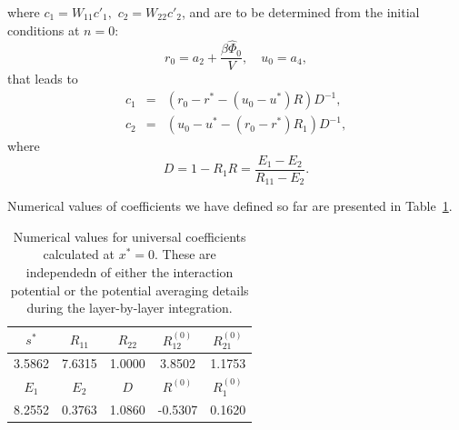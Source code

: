 where $c_1 = W_{11} c'_1,$ $c_2 = W_{22} c'_2$, and are to be determined from the initial conditions at $n=0$:
\begin{equation*}
	r_0 = a_2 + \frac{\beta\hat{\Phi}_0}{V},
	\quad
	u_0 = a_4,
\end{equation*}
that leads to
\begin{eqnarray*}
	c_1 & = & (r_0 - r^* -(u_0 - u^*)R)D^{-1},
	\\
	c_2 & = &  (u_0 - u^* - (r_0 - r^*)R_1)D^{-1},
\end{eqnarray*}
where
\begin{equation*}
	D = 1 - R_1 R = \frac{E_1 - E_2}{R_{11} - E_2}.
\end{equation*}

Numerical values of coefficients we have defined so far are presented in Table~\ref{tab:num_coef}.

\begin{table}[h]
	\caption{Numerical values for universal coefficients calculated at $x^* = 0$. These are independedn of either the interaction potential or the potential averaging details during the layer-by-layer integration.}
	\begin{center}
		\begin{tabular}{|c|c|c|c|c|}
			\hline
			$s^*$ & $R_{11}$ \quad & $R_{22}$ & $R_{12}^{(0)}$  & $R_{21}^{(0)}$\\
			\hline
			3.5862 & 7.6315  & 1.0000 & 3.8502 & 1.1753 \\
			\hline
			\hline
			$E_1$ & $E_2$ \quad & $D$ & $R^{(0)}$  & $R_1^{(0)}$\\
			\hline
			8.2552 & 0.3763  & 1.0860 & -0.5307 & 0.1620 \\
			\hline
		\end{tabular}
	\end{center}
	\label{tab:num_coef}
\end{table}

